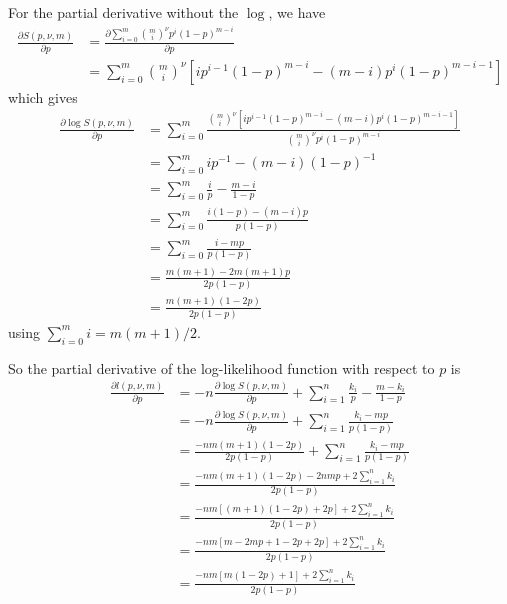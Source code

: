 \documentclass[a4paper,12pt]{article}
\theoremstyle{definition}
\newcommand{\pdiff}[2]{\frac{\partial #1}{\partial #2}} %
\begin{document}
For the partial derivative without the $\log$, we have
\begin{align}
  \pdiff{S(p, \nu, m)}{p} &= \pdiff{\sum_{i=0}^m \binom{m}{i}^{\nu} p^i (1-p)^{m-i}}{p} \\
  & = \sum_{i=0}^m \binom{m}{i}^{\nu} \left[ i p^{i-1}(1-p)^{m-i} - (m-i)p^i(1-p)^{m-i-1} \right]
\end{align}
which gives
\begin{align}
  \pdiff{\log S(p, \nu, m)}{p} & = \sum_{i=0}^m \frac{\binom{m}{i}^{\nu} \left[ i p^{i-1}(1-p)^{m-i} - (m-i)p^i(1-p)^{m-i-1} \right]}{\binom{m}{i}^{\nu} p^{i} (1-p)^{m-i}} \\
  & = \sum_{i=0}^m i p^{-1} - (m-i) (1-p)^{-1} \\
  & = \sum_{i=0}^m \frac{i}{p} - \frac{m-i}{1-p} \\
  & = \sum_{i=0}^m \frac{i(1-p) - (m-i)p}{p(1-p)} \\
  & = \sum_{i=0}^m \frac{i - mp}{p(1-p)} \\
  & = \frac{m(m+1) -2m(m+1)p}{2p(1-p)} \\
  & = \frac{m(m+1)(1-2p)}{2p(1-p)}
\end{align}
using $\sum_{i=0}^{m} i = m(m+1)/2$.

So the partial derivative of the log-likelihood function with respect to $p$ is
\begin{align}
  \pdiff{l(p,\nu,m)}{p} & = -n \pdiff{\log S(p, \nu, m)}{p} + \sum_{i=1}^n \frac{k_i}{p} - \frac{m-k_i}{1-p} \\
  & = -n \pdiff{\log S(p, \nu, m)}{p} + \sum_{i=1}^n \frac{k_i - mp}{p(1-p)} \\
  & = \frac{-nm(m+1)(1-2p)}{2p(1-p)} + \sum_{i=1}^n \frac{k_i - mp}{p(1-p)} \\
  & = \frac{-nm(m+1)(1-2p) - 2nmp + 2\sum_{i=1}^n k_i}{2p(1-p)} \\
  & = \frac{-nm\left[ (m+1)(1-2p) + 2p \right] + 2\sum_{i=1}^n k_i}{2p(1-p)} \\
  & = \frac{-nm \left[m - 2mp + 1 -2p +2p \right] + 2 \sum_{i=1}^n k_i}{2p(1-p)} \\
  & = \frac{-nm\left[ m(1-2p) + 1\right] + 2 \sum_{i=1}^n k_i}{2p(1-p)}
\end{align}

\newpage

\end{document}
